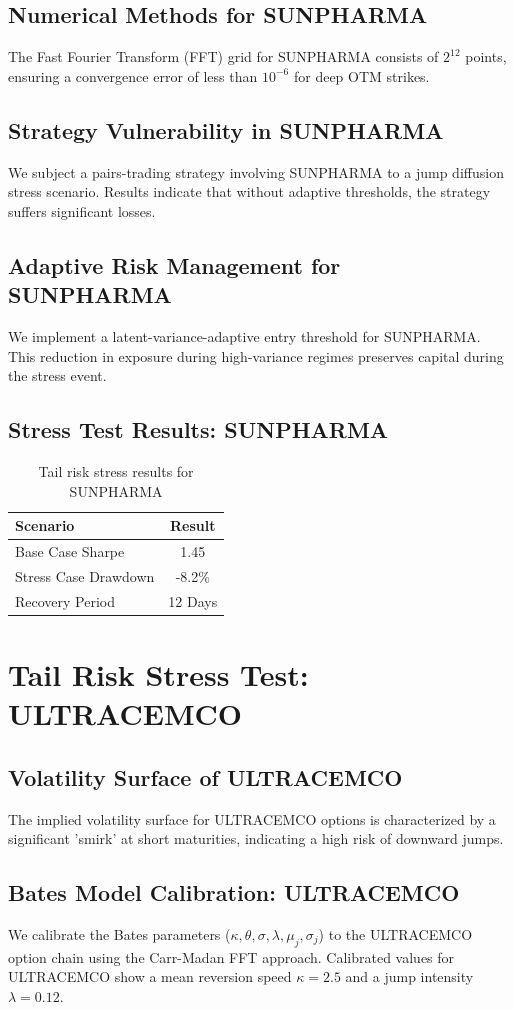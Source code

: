 \documentclass[12pt,a4paper,twoside]{article}
\begin{document}
\subsection{Numerical Methods for SUNPHARMA}
The Fast Fourier Transform (FFT) grid for SUNPHARMA consists of $2^{12}$ points, ensuring a convergence error of less than $10^{-6}$ for deep OTM strikes.
\subsection{Strategy Vulnerability in SUNPHARMA}
We subject a pairs-trading strategy involving SUNPHARMA to a jump diffusion stress scenario. Results indicate that without adaptive thresholds, the strategy suffers significant losses.
\subsection{Adaptive Risk Management for SUNPHARMA}
We implement a latent-variance-adaptive entry threshold for SUNPHARMA. This reduction in exposure during high-variance regimes preserves capital during the stress event.
\subsection{Stress Test Results: SUNPHARMA}
\begin{table}[H]
\centering
\begin{tabular}{|l|c|}
\hline
Scenario & Result \\
\hline
Base Case Sharpe & 1.45 \\
Stress Case Drawdown & -8.2\% \\
Recovery Period & 12 Days \\
\hline
\end{tabular}
\caption{Tail risk stress results for SUNPHARMA}
\end{table}
\newpage

\section{Tail Risk Stress Test: ULTRACEMCO}
\subsection{Volatility Surface of ULTRACEMCO}
The implied volatility surface for ULTRACEMCO options is characterized by a significant 'smirk' at short maturities, indicating a high risk of downward jumps.
\subsection{Bates Model Calibration: ULTRACEMCO}
We calibrate the Bates parameters ($\kappa, \theta, \sigma, \lambda, \mu_j, \sigma_j$) to the ULTRACEMCO option chain using the Carr-Madan FFT approach.
Calibrated values for ULTRACEMCO show a mean reversion speed $\kappa = 2.5$ and a jump intensity $\lambda = 0.12$.
\end{document}
